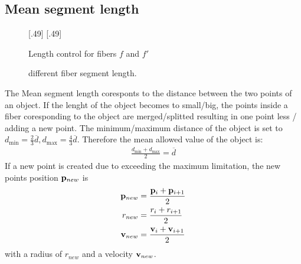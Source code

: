 \subsection{Mean segment length}
% 
\begin{figure}[!t]
    \centering
    \setlength{\tikzwidth}{.45\textwidth}
    [.49\textwidth]{
    }
    [.49\textwidth]{
    }
	\caption{Length control for fibers $f$ and $f'$}
	\label{fig:merge_split}
\end{figure}
% 
% 
\begin{figure}[!t]
    \centering
    \setlength{\tikzwidth}{0.75\textwidth}
    \tikzset{external/export next=false}
	\caption{different fiber segment length.}
	\label{fig:model_length}
\end{figure}
% 
The Mean segment length coresponts to the distance between the two points of an object.
If the lenght of the object becomes to small/big, the points inside a fiber coresponding to the object are merged/splitted resulting in one point less / adding a new point.
The minimum/maximum distance of the object is set to $d_{\min} = \frac{2}{3} \overline{d}, d_{\max} = \frac{4}{3}\overline{d}$.
Therefore the mean allowed value of the object is:
\begin{align}
\frac{d_{\min} + d_{\max}}{2} = \overline{d}
\end{align}
% 
If a new point is created due to exceeding the maximum limitation, the new points position $\mathbf{p}_{new}$ is 
\begin{align}
\begin{split}
\mathbf{p}_{new} &= \frac{\mathbf{p}_{i} + \mathbf{p}_{i+1}}{2}\\
r_{new} &= \frac{r_{i} + r_{i+1}}{2}\\
\mathbf{v}_{new} &= \frac{\mathbf{v}_{i} + \mathbf{v}_{i+1}}{2}
\end{split}
\end{align}
with a radius of $r_{new}$ and a velocity $\mathbf{v}_{new}$.
% 
